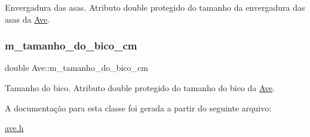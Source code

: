 Envergadura das asas. Atributo double protegido do tamanho da envergadura das asas da \hyperlink{classAve}{Ave}. \mbox{\label{classAve_a6b226ae4077430877b040141105a9890}} 
\subsubsection{\texorpdfstring{m\+\_\+tamanho\+\_\+do\+\_\+bico\+\_\+cm}{m\_tamanho\_do\_bico\_cm}}
{\footnotesize\ttfamily double Ave\+::m\+\_\+tamanho\+\_\+do\+\_\+bico\+\_\+cm\hspace{0.3cm}{\ttfamily [protected]}}

Tamanho do bico. Atributo double protegido do tamanho do bico da \hyperlink{classAve}{Ave}. 

A documentação para esta classe foi gerada a partir do seguinte arquivo\+:\begin{DoxyCompactItemize}
\item 
\hyperlink{ave_8h}{ave.\+h}\end{DoxyCompactItemize}
